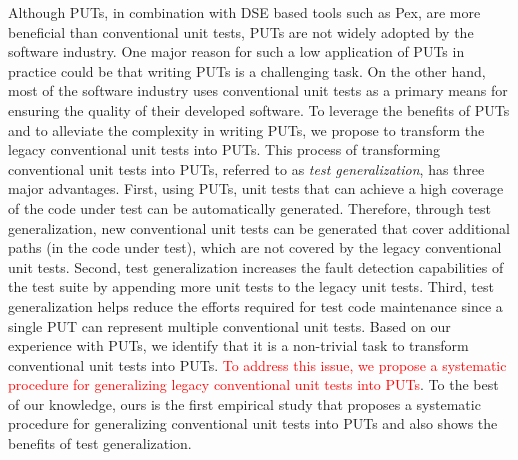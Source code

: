Although PUTs, in combination with DSE based tools such as Pex, are more beneficial than conventional unit tests, PUTs are not widely adopted by the software industry. One major reason for such a low application of PUTs in practice could be that writing PUTs is a challenging task. On the other hand, most of the software industry uses conventional unit tests as a primary means for ensuring the quality of their developed software. To leverage the benefits of PUTs and to alleviate the complexity in writing PUTs, we propose to transform the legacy conventional unit tests into PUTs. This process of transforming conventional unit tests into PUTs, referred to as \emph{test generalization}, has three major advantages. First, using PUTs, unit tests that can achieve a high coverage of the code under test can be automatically generated. Therefore, through test generalization, new conventional unit tests can be generated that cover additional paths (in the code under test), which are not covered by the legacy conventional unit tests. Second, test generalization increases the fault detection capabilities of the test suite by appending more unit tests to the legacy unit tests. Third, test generalization helps reduce the efforts required for test code maintenance since a single PUT can represent multiple conventional unit tests. Based on our experience with PUTs, we identify that it is a non-trivial task to transform conventional unit tests into PUTs. \textcolor{red}{To address this issue, we propose a systematic procedure for generalizing legacy conventional unit tests into PUTs}. To the best of our knowledge, ours is the first empirical study that proposes a systematic procedure for generalizing conventional unit tests into PUTs and also shows the benefits of test generalization. 

